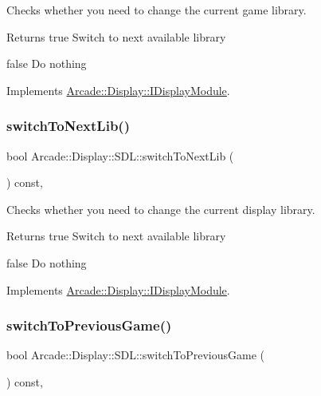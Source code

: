 Checks whether you need to change the current game library. 

\begin{DoxyReturn}{Returns}
true Switch to next available library 

false Do nothing 
\end{DoxyReturn}


Implements \mbox{\hyperlink{classArcade_1_1Display_1_1IDisplayModule_a9584cb0ca3b157c9a4ec94509e4f8e32}{Arcade\+::\+Display\+::\+I\+Display\+Module}}.

\mbox{\label{classArcade_1_1Display_1_1SDL_a91bee5a87dfcacb4da9d6d148dc52a2b}} 
\subsubsection{\texorpdfstring{switchToNextLib()}{switchToNextLib()}}
{\footnotesize\ttfamily bool Arcade\+::\+Display\+::\+S\+D\+L\+::switch\+To\+Next\+Lib (\begin{DoxyParamCaption}{ }\end{DoxyParamCaption}) const\hspace{0.3cm}{\ttfamily [final]}, {\ttfamily [virtual]}}



Checks whether you need to change the current display library. 

\begin{DoxyReturn}{Returns}
true Switch to next available library 

false Do nothing 
\end{DoxyReturn}


Implements \mbox{\hyperlink{classArcade_1_1Display_1_1IDisplayModule_a0de47361c9d47bf8fc52070b945f23b7}{Arcade\+::\+Display\+::\+I\+Display\+Module}}.

\mbox{\label{classArcade_1_1Display_1_1SDL_ad9bf495fb4e7499c81b2d65a0602e7f1}} 
\subsubsection{\texorpdfstring{switchToPreviousGame()}{switchToPreviousGame()}}
{\footnotesize\ttfamily bool Arcade\+::\+Display\+::\+S\+D\+L\+::switch\+To\+Previous\+Game (\begin{DoxyParamCaption}{ }\end{DoxyParamCaption}) const\hspace{0.3cm}{\ttfamily [final]}, {\ttfamily [virtual]}}



